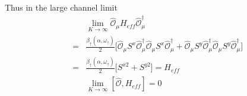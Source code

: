 \documentclass[reprint,prb,superscriptaddress]{revtex4-2}
\begin{document}
%
%
%

Thus in the large channel limit
\begin{eqnarray}
&& \lim_{K\rightarrow \infty}\hat{\mathcal{O}}_{\mu} H_{eff} \hat{\mathcal{O}}_{\mu}^{\dagger}\nonumber\\
 &=& \frac{\beta_{\uparrow}(\alpha,\omega_{\uparrow})}{2} \bigg[ \hat{\mathcal{O}}_{\mu} S^x \hat{\mathcal{O}}_{\mu}^{\dagger} \hat{\mathcal{O}}_{\mu} S^x \hat{\mathcal{O}}_{\mu}^{\dagger}  + \hat{\mathcal{O}}_{\mu} S^y \hat{\mathcal{O}}_{\mu}^{\dagger} \hat{\mathcal{O}}_{\mu} S^y \hat{\mathcal{O}}_{\mu}^{\dagger}  \bigg]\nonumber\\
&=&\frac{\beta_{\uparrow}(\alpha,\omega_{\uparrow})}{2} \bigg[  S^{x2}+S^{y2}  \bigg] = H_{eff} \nonumber\\
&&\lim_{K\rightarrow \infty } [\hat{\mathcal{O}},H_{eff}] = 0
\label{eq:hamiltonian_twisted}
\end{eqnarray}
 
\end{document}
